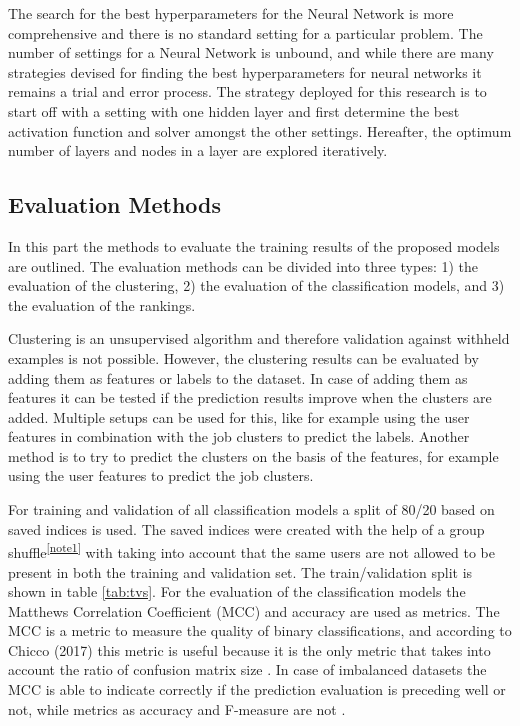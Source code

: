 The search for the best hyperparameters for the Neural Network is more comprehensive and there is no standard setting for a particular problem. 
The number of settings for a Neural Network is unbound, and while there are many strategies devised for finding the best hyperparameters for neural networks \cite{larochelle2009exploring} it remains a trial and error process.
The strategy deployed for this research is to start off with a setting with one hidden layer and first determine the best activation function and solver amongst the other settings.
Hereafter, the optimum number of layers and nodes in a layer are explored iteratively.

\subsection{Evaluation Methods}
\label{ssec:eval}
In this part the methods to evaluate the training results of the proposed models are outlined.
The evaluation methods can be divided into three types: 1) the evaluation of the clustering, 2) the evaluation of the classification models, and 3) the evaluation of the rankings.

Clustering is an unsupervised algorithm and therefore validation against withheld examples is not possible.
However, the clustering results can be evaluated by adding them as features or labels to the dataset.
In case of adding them as features it can be tested if the prediction results improve when the clusters are added.
Multiple setups can be used for this, like for example using the user features in combination with the job clusters to predict the labels.
Another method is to try to predict the clusters on the basis of the features, for example using the user features to predict the job clusters. 

For training and validation of all classification models a split of 80/20 based on saved indices is used. 
The saved indices were created with the help of a group shuffle\textsuperscript{\ref{note1}} with taking into account that the same users are not allowed to be present in both the training and validation set.
The train/validation split is shown in table \ref{tab:tvs}.
For the evaluation of the classification models the Matthews Correlation Coefficient (MCC) \cite{matthews1975comparison} and accuracy are used as metrics.
The MCC is a metric to measure the quality of binary classifications, and according to Chicco (2017) this metric is useful because it is the only metric that takes into account the ratio of confusion matrix size \cite{chicco2017ten}.
In case of imbalanced datasets the MCC is able to indicate correctly if the prediction evaluation is preceding well or not, while metrics as accuracy and F-measure are not \cite{boughorbel2017optimal}.

